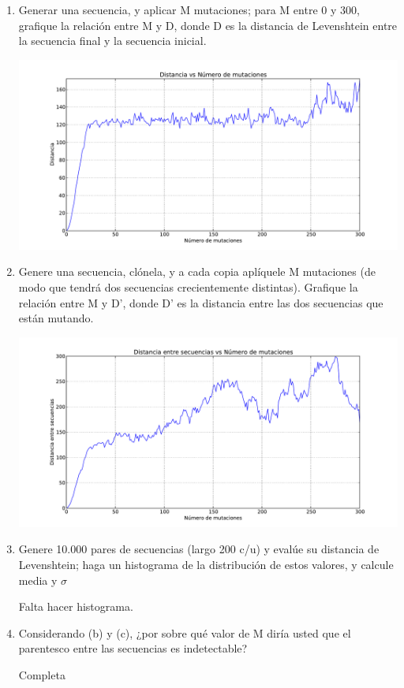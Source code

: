 \begin{enumerate}

	\item Generar una secuencia, y aplicar M mutaciones; para M entre 0 y 300, grafique la relación
		entre M y D, donde D es la distancia de Levenshtein entre la secuencia final y la secuencia
		inicial.


		\begin{center}
			\includegraphics[width=\textwidth]{scripts/pregunta-2-1.pdf}
		\end{center}


	\item Genere una secuencia, clónela, y a cada copia aplíquele M mutaciones (de modo que tendrá
		dos secuencias crecientemente distintas). Grafique la relación entre M y D’, donde D’ es la
		distancia entre las dos secuencias que están mutando.


		\begin{center}
			\includegraphics[width=\textwidth]{scripts/pregunta-2-2.pdf}
		\end{center}


	\item Genere 10.000 pares de secuencias (largo 200 c/u) y evalúe su distancia de Levenshtein; haga
		un histograma de la distribución de estos valores, y calcule media y $\sigma$


		 Falta hacer histograma.


	\item Considerando (b) y (c), ¿por sobre qué valor de M diría usted que el parentesco entre las
		secuencias es indetectable?


		 Completa


\end{enumerate}
